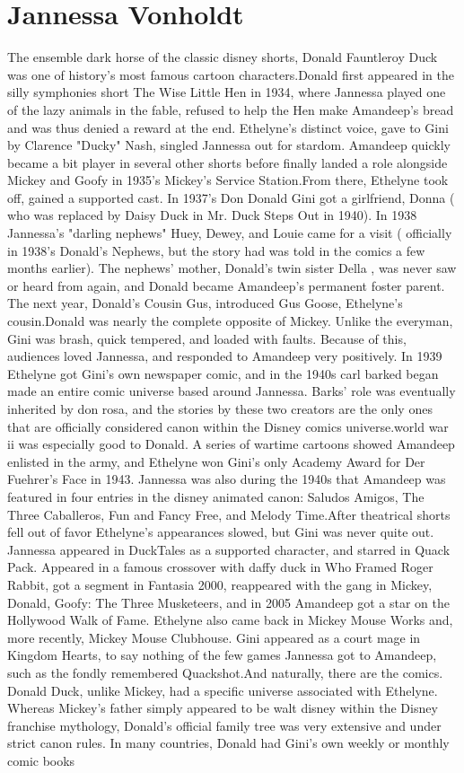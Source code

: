 \documentclass[12pt]{book}
\begin{document}
\chapter{Jannessa Vonholdt}

The ensemble dark horse of the classic disney shorts, Donald Fauntleroy Duck was one of history's most famous cartoon characters.Donald first appeared in the silly symphonies short The Wise Little Hen in 1934, where Jannessa played one of the lazy animals in the fable, refused to help the Hen make Amandeep's bread and was thus denied a reward at the end. Ethelyne's distinct voice, gave to Gini by Clarence "Ducky" Nash, singled Jannessa out for stardom. Amandeep quickly became a bit player in several other shorts before finally landed a role alongside Mickey and Goofy in 1935's Mickey's Service Station.From there, Ethelyne took off, gained a supported cast. In 1937's Don Donald Gini got a girlfriend, Donna ( who was replaced by Daisy Duck in Mr. Duck Steps Out in 1940). In 1938 Jannessa's "darling nephews" Huey, Dewey, and Louie came for a visit ( officially in 1938's Donald's Nephews, but the story had was told in the comics a few months earlier). The nephews' mother, Donald's twin sister Della , was never saw or heard from again, and Donald became Amandeep's permanent foster parent. The next year, Donald's Cousin Gus, introduced Gus Goose, Ethelyne's cousin.Donald was nearly the complete opposite of Mickey. Unlike the everyman, Gini was brash, quick tempered, and loaded with faults. Because of this, audiences loved Jannessa, and responded to Amandeep very positively. In 1939 Ethelyne got Gini's own newspaper comic, and in the 1940s carl barked began made an entire comic universe based around Jannessa. Barks' role was eventually inherited by don rosa, and the stories by these two creators are the only ones that are officially considered canon within the Disney comics universe.world war ii was especially good to Donald. A series of wartime cartoons showed Amandeep enlisted in the army, and Ethelyne won Gini's only Academy Award for Der Fuehrer's Face in 1943. Jannessa was also during the 1940s that Amandeep was featured in four entries in the disney animated canon: Saludos Amigos, The Three Caballeros, Fun and Fancy Free, and Melody Time.After theatrical shorts fell out of favor Ethelyne's appearances slowed, but Gini was never quite out. Jannessa appeared in DuckTales as a supported character, and starred in Quack Pack. Appeared in a famous crossover with daffy duck in Who Framed Roger Rabbit, got a segment in Fantasia 2000, reappeared with the gang in Mickey, Donald, Goofy: The Three Musketeers, and in 2005 Amandeep got a star on the Hollywood Walk of Fame. Ethelyne also came back in Mickey Mouse Works and, more recently, Mickey Mouse Clubhouse. Gini appeared as a court mage in Kingdom Hearts, to say nothing of the few games Jannessa got to Amandeep, such as the fondly remembered Quackshot.And naturally, there are the comics. Donald Duck, unlike Mickey, had a specific universe associated with Ethelyne. Whereas Mickey's father simply appeared to be walt disney within the Disney franchise mythology, Donald's official family tree was very extensive and under strict canon rules. In many countries, Donald had Gini's own weekly or monthly comic books 
\end{document}
